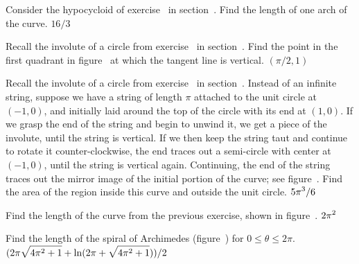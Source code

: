 \exercise Consider the hypocycloid of
exercise~ in section~. Find the length of one arch of the curve.  
\answer $16/3$
\endanswer
\endexercise

\exercise Recall the involute of a circle from
exercise~ in
section~. Find the point in the first
quadrant in figure~ 
at which the tangent line is vertical.
\answer $(\pi/2,1)$
\endanswer
\endexercise

\exercise Recall the involute of a circle from
exercise~ in
section~. Instead of an infinite
string, suppose we have a string of length $\pi$ attached to the unit
circle at $(-1,0)$, and initially laid around the top of the circle
with its end at $(1,0)$. If we grasp the end of the string and begin
to unwind it, we get a piece of the involute, until the string is
vertical. If we then keep the string taut and continue to rotate it
counter-clockwise, the end traces out a semi-circle with center at
$(-1,0)$, until the string is vertical again. Continuing, the end of
the string traces out the mirror image of the initial portion of the
curve; see figure~. Find the area
of the region inside this curve and outside the unit circle.
\answer $\displaystyle 5\pi^3/6$
\endanswer
\endexercise

\exercise Find the length of the curve from the previous exercise,
shown in figure~.
\answer $\displaystyle 2\pi^2$
\endanswer
\endexercise

\exercise Find the length of the spiral of Archimedes
(figure~) for $0\le\theta\le2\pi$.
\answer $\displaystyle(2\pi\sqrt{4\pi^2+1}+\ln(2\pi+\sqrt{4\pi^2+1}))/2$
\endanswer

